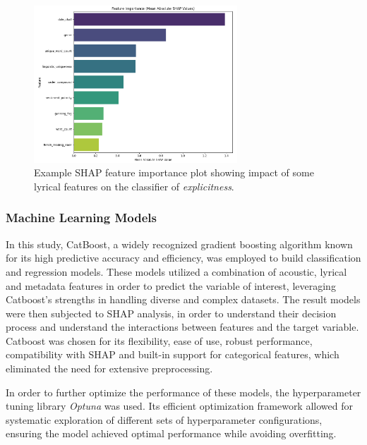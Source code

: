 \begin{center}
\begin{figure}[H]
  \centering
  \includegraphics[width=3in]{img/shap_feature_importance.png}
  \caption{Example SHAP feature importance plot showing impact of some lyrical features
  on the classifier of \textit{explicitness}.}
  \label{Figure:fig_beh}
\end{figure}
\end{center}

\subsubsection*{Machine Learning Models}
In this study, CatBoost, a widely recognized gradient boosting
algorithm known for its high predictive accuracy and efficiency, was employed
to build classification and regression models. These models utilized a
combination of acoustic, lyrical and metadata features in order to predict the
variable of interest, leveraging Catboost's strengths in handling diverse and
complex datasets. The result models were then subjected to SHAP analysis, in
order to understand their decision process and understand the interactions
between features and the target variable. Catboost was chosen for its
flexibility, ease of use, robust performance, compatibility with SHAP and
built-in support for categorical features,  which eliminated the need for
extensive preprocessing.\cite{catboost}

In order to further optimize the performance of these models, the
hyperparameter tuning library \textit{Optuna} was used. Its
efficient optimization framework allowed for systematic exploration of
different sets of hyperparameter configurations, ensuring the model achieved
optimal performance while avoiding overfitting.\cite{optuna} 

